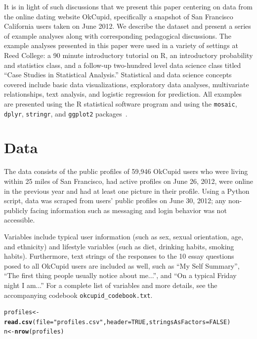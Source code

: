\documentclass{article}\usepackage[]{graphicx}\usepackage[]{color}
\makeatletter
\newcommand{\hlnum}[1]{\textcolor[rgb]{0.686,0.059,0.569}{#1}}%
\newcommand{\hlstr}[1]{\textcolor[rgb]{0.192,0.494,0.8}{#1}}%
\newcommand{\hlstd}[1]{\textcolor[rgb]{0.345,0.345,0.345}{#1}}%
\newcommand{\hlkwb}[1]{\textcolor[rgb]{0.69,0.353,0.396}{#1}}%
\newcommand{\hlkwc}[1]{\textcolor[rgb]{0.333,0.667,0.333}{#1}}%
\newcommand{\hlkwd}[1]{\textcolor[rgb]{0.737,0.353,0.396}{\textbf{#1}}}%
\newenvironment{kframe}{%
 \def\at@end@of@kframe{}%
 \ifinner\ifhmode%
  \def\at@end@of@kframe{\end{minipage}}%
  \begin{minipage}{\columnwidth}%
 \fi\fi%
 \def\FrameCommand##1{\hskip\@totalleftmargin \hskip-\fboxsep
 \colorbox{shadecolor}{##1}\hskip-\fboxsep
     \hskip-\linewidth \hskip-\@totalleftmargin \hskip\columnwidth}%
 \MakeFramed {\advance\hsize-\width
   \@totalleftmargin\z@ \linewidth\hsize
   \@setminipage}}%
 {\par\unskip\endMakeFramed%
 \at@end@of@kframe}
\newenvironment{knitrout}{}{} %
\makeatother
\begin{document}
It is in light of such discussions that we present this paper centering on data from the online dating website OkCupid, specifically a snapshot of San Francisco California users taken on June 2012.  We describe the dataset and present a series of example analyses along with corresponding pedagogical discussions.  The example analyses presented in this paper were used in a variety of settings at Reed College: a 90 minute introductory tutorial on R, an introductory probability and statistics class, and a follow-up two-hundred level data science class titled ``Case Studies in Statistical Analysis.''  Statistical and data science concepts covered include basic data visualizations, exploratory data analyses, multivariate relationships, text analysis, and logistic regression for prediction.  All examples are presented using the R statistical software program and using the \verb#mosaic#, \verb#dplyr#, \verb#stringr#, and \verb#ggplot2# packages~\cite{mosaic, dplyr, stringr, ggplot2}.








%
\section{Data}
%
The data consists of the public profiles of 59,946 OkCupid users who were living within 25 miles of San Francisco, had active profiles on June 26, 2012, were online in the previous year and had at least one picture in their profile.  Using a Python script, data was scraped from users' public profiles on June 30, 2012; any non-publicly facing information such as messaging and login behavior was not accessible.

Variables include typical user information (such as sex, sexual orientation, age, and ethnicity) and lifestyle variables (such as diet, drinking habits, smoking habits).  Furthermore, text strings of the responses to the 10 essay questions posed to all OkCupid users are included as well, such as ``My Self Summary'', ``The first thing people usually notice about me...'', and ``On a typical Friday night I am...''  For a complete list of variables and more details, see the accompanying codebook \verb#okcupid_codebook.txt#.

\begin{knitrout}
\color{fgcolor}\begin{kframe}
\begin{alltt}
\hlstd{profiles} \hlkwb{<-} \hlkwd{read.csv}\hlstd{(}\hlkwc{file}\hlstd{=}\hlstr{"profiles.csv"}\hlstd{,} \hlkwc{header}\hlstd{=}\hlnum{TRUE}\hlstd{,} \hlkwc{stringsAsFactors}\hlstd{=}\hlnum{FALSE}\hlstd{)}
\hlstd{n} \hlkwb{<-} \hlkwd{nrow}\hlstd{(profiles)}
\end{alltt}
\end{kframe}
\end{knitrout}
\end{document}
